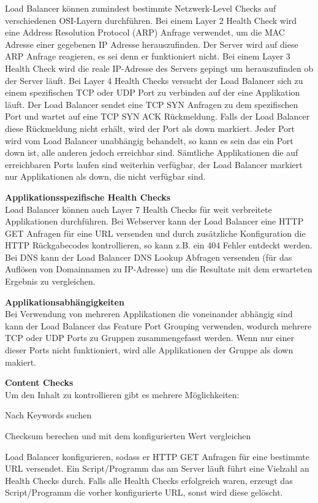 Load Balancer können zumindest bestimmte Netzwerk-Level Checks auf verschiedenen OSI-Layern durchführen. Bei einem Layer 2 Health Check wird eine Address Resolution Protocol (ARP) Anfrage verwendet, um die MAC Adresse einer gegebenen IP Adresse herauszufinden. Der Server wird auf diese ARP Anfrage reagieren, es sei denn er funktioniert nicht. Bei einem Layer 3 Health Check wird die reale IP-Adresse des Servers gepingt um herauszufinden ob der Server läuft. Bei Layer 4 Health Checks versucht der Load Balancer sich zu einem spezifischen TCP oder UDP Port zu verbinden auf der eine Applikation läuft. Der Load Balancer sendet eine TCP SYN Anfragen zu dem spezifischen Port und wartet auf eine TCP SYN ACK Rückmeldung. Falls der Load Balancer diese Rückmeldung nicht erhält, wird der Port als down markiert. Jeder Port wird vom Load Balancer unabhängig behandelt, so kann es sein das ein Port down ist, alle anderen jedoch erreichbar sind. Sämtliche Applikationen die auf erreichbaren Ports laufen sind weiterhin verfügbar, der Load Balancer markiert nur Applikationen als down, die nicht verfügbar sind.\vspace{5mm}

\textbf{Applikationsspezifische Health Checks} \\

Load Balancer können auch Layer 7 Health Checks für weit verbreitete Applikationen durchführen.  Bei Webserver kann der Load Balancer eine HTTP GET Anfragen für eine URL versenden und durch zusätzliche Konfiguration die HTTP Rückgabecodes kontrollieren, so kann z.B. ein 404 Fehler entdeckt werden. Bei DNS kann der Load Balancer DNS Lookup Abfragen versenden (für das Auflösen von Domainnamen zu IP-Adresse) um die Resultate mit dem erwarteten Ergebnis zu vergleichen.\vspace{5mm}

\textbf{Applikationsabhängigkeiten} \\

Bei Verwendung von mehreren Applikationen die voneinander abhängig sind kann der Load Balancer das Feature Port Grouping verwenden, wodurch mehrere TCP oder UDP Ports zu Gruppen zusammengefasst werden. Wenn nur einer dieser Ports nicht funktioniert, wird alle Applikationen der Gruppe als down makiert.\vspace{5mm}
\pagebreak

\textbf{Content Checks} \\

Um den Inhalt zu kontrollieren gibt es mehrere Möglichkeiten: 
\begin{list}{•}{}
\item Nach Keywords suchen
\item Checksum berechen und mit dem konfigurierten Wert vergleichen
\item Load Balancer konfigurieren, sodass er HTTP GET Anfragen für eine bestimmte URL versendet. Ein Script/Programm das am Server läuft führt eine Vielzahl an Health Checks durch. Falls alle Health Checks erfolgreich waren, erzeugt das Script/Programm die vorher konfigurierte URL, sonst wird diese gelöscht. \cite{LoadBalancing2}
\end{list}

